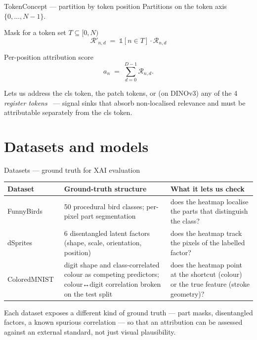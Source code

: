 \documentclass[
  aspectratio=169,
]{beamer}
\newcommand{\Rel}{\mathcal{R}}
\begin{document}
\begin{frame}{TokenConcept — partition by token position}
Partitions on the token axis $\{0, \ldots, N-1\}$.

\begin{block}{Mask for a token set $T \subseteq [0, N)$}
\[
  \Rel'_{n, d} \;=\; \mathbb{1}[n \in T] \cdot \Rel_{n, d}
\]
\end{block}

\begin{block}{Per-position attribution score}
\[
  a_n \;=\; \sum_{d=0}^{D-1} \Rel_{n, d}.
\]
\end{block}

Lets us address the cls token, the patch tokens, or (on DINOv3) any
of the 4 \emph{register tokens}~\cite{darcet2024dinov3} —
signal sinks that absorb non-localised relevance and must be
attributable separately from the cls token.
\end{frame}

\section[Datasets]{Datasets and models}

\begin{frame}{Datasets — ground truth for XAI evaluation}
\centering\small
\begin{tabular}{l p{} p{}}
\toprule
Dataset & Ground-truth structure & What it lets us check \\
\midrule
FunnyBirds~\cite{hesse2023funnybirds}
  & 50 procedural bird classes; per-pixel part segmentation
  & does the heatmap localise the parts that distinguish the class? \\
dSprites~\cite{higgins2017dsprites}
  & 6 disentangled latent factors (shape, scale, orientation, position)
  & does the heatmap track the pixels of the labelled factor? \\
ColoredMNIST~\cite{nam2020lff}
  & digit shape and class-correlated colour as competing predictors;
    colour↔digit correlation broken on the test split
  & does the heatmap point at the shortcut (colour) or the true
    feature (stroke geometry)? \\
\bottomrule
\end{tabular}

\vspace{2mm}
Each dataset exposes a different kind of ground truth — part masks,
disentangled factors, a known spurious correlation — so that an
attribution can be assessed against an external standard, not just
visual plausibility.
\end{frame}
\end{document}
